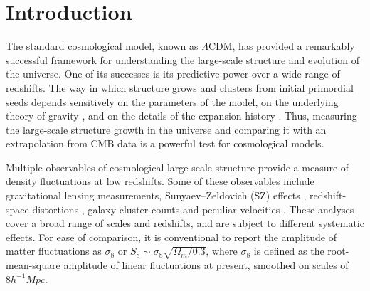 \documentclass[twocolumn]{aastex631}
\begin{document}
\section{Introduction} \label{sec:intro}

The standard cosmological model, known as $\Lambda$CDM, has provided a remarkably successful framework for understanding the large-scale structure and evolution of the universe. One of its successes is its predictive power over a wide range of redshifts.
The way in which structure grows and clusters from initial primordial seeds depends sensitively on the parameters of the model, on the underlying theory of gravity \citep[e.g.,][]{PhysRevD.109.083540}, and on the details of the expansion history \citep[e.g.,][]{Sailer:2021yzm}. Thus, measuring the large-scale structure growth in the universe and comparing it with an extrapolation from CMB data is a powerful test for cosmological models.

    Multiple observables of cosmological large-scale structure provide a measure of density fluctuations at low redshifts. Some of these observables include gravitational lensing measurements, Sunyaev--Zeldovich (SZ) effects \citep{Carlstrom_2002,Horowitz_2017,bolliet2018cosmological}, redshift-space distortions \citep{Ivanov_2020,d_Amico_2020,Colas_2020}, galaxy cluster counts \citep{planckcluster2016,Haan_2016,Abbott_2020cluster, salcedo2023dark,bocquet2024spt} and peculiar velocities \citep{Howlett:2022len,Saulder:2023oqm,Stahl:2021mat}. These analyses cover a broad range of scales and redshifts, and are subject to different systematic effects. For ease of comparison, it is conventional to report the amplitude of matter fluctuations as $\sigma_8$ or $S_8\sim\sigma_8\sqrt{\Omega_m/0.3}$, where $\sigma_8$ is defined as the root-mean-square amplitude of linear fluctuations at present, smoothed on scales of $8h^{-1}\si{Mpc}$. 
\end{document}
